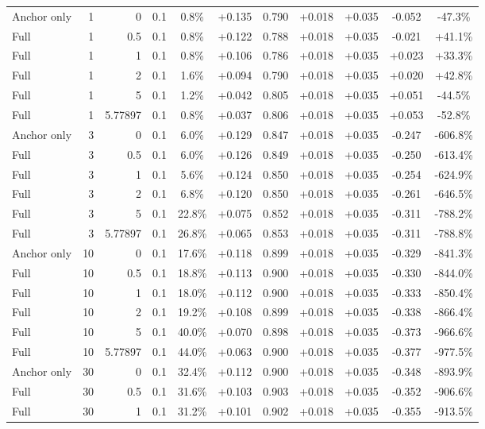 \begin{table}[htbp]
\begin{tabular}{lrrrccccccc}
Anchor only & 1 & 0 & 0.1 & 0.8\% & +0.135 & 0.790 & +0.018 & +0.035 & -0.052 & -47.3\% \\
Full & 1 & 0.5 & 0.1 & 0.8\% & +0.122 & 0.788 & +0.018 & +0.035 & -0.021 & +41.1\% \\
Full & 1 & 1 & 0.1 & 0.8\% & +0.106 & 0.786 & +0.018 & +0.035 & +0.023 & +33.3\% \\
Full & 1 & 2 & 0.1 & 1.6\% & +0.094 & 0.790 & +0.018 & +0.035 & +0.020 & +42.8\% \\
Full & 1 & 5 & 0.1 & 1.2\% & +0.042 & 0.805 & +0.018 & +0.035 & +0.051 & -44.5\% \\
Full & 1 & 5.77897 & 0.1 & 0.8\% & +0.037 & 0.806 & +0.018 & +0.035 & +0.053 & -52.8\% \\
Anchor only & 3 & 0 & 0.1 & 6.0\% & +0.129 & 0.847 & +0.018 & +0.035 & -0.247 & -606.8\% \\
Full & 3 & 0.5 & 0.1 & 6.0\% & +0.126 & 0.849 & +0.018 & +0.035 & -0.250 & -613.4\% \\
Full & 3 & 1 & 0.1 & 5.6\% & +0.124 & 0.850 & +0.018 & +0.035 & -0.254 & -624.9\% \\
Full & 3 & 2 & 0.1 & 6.8\% & +0.120 & 0.850 & +0.018 & +0.035 & -0.261 & -646.5\% \\
Full & 3 & 5 & 0.1 & 22.8\% & +0.075 & 0.852 & +0.018 & +0.035 & -0.311 & -788.2\% \\
Full & 3 & 5.77897 & 0.1 & 26.8\% & +0.065 & 0.853 & +0.018 & +0.035 & -0.311 & -788.8\% \\
Anchor only & 10 & 0 & 0.1 & 17.6\% & +0.118 & 0.899 & +0.018 & +0.035 & -0.329 & -841.3\% \\
Full & 10 & 0.5 & 0.1 & 18.8\% & +0.113 & 0.900 & +0.018 & +0.035 & -0.330 & -844.0\% \\
Full & 10 & 1 & 0.1 & 18.0\% & +0.112 & 0.900 & +0.018 & +0.035 & -0.333 & -850.4\% \\
Full & 10 & 2 & 0.1 & 19.2\% & +0.108 & 0.899 & +0.018 & +0.035 & -0.338 & -866.4\% \\
Full & 10 & 5 & 0.1 & 40.0\% & +0.070 & 0.898 & +0.018 & +0.035 & -0.373 & -966.6\% \\
Full & 10 & 5.77897 & 0.1 & 44.0\% & +0.063 & 0.900 & +0.018 & +0.035 & -0.377 & -977.5\% \\
Anchor only & 30 & 0 & 0.1 & 32.4\% & +0.112 & 0.900 & +0.018 & +0.035 & -0.348 & -893.9\% \\
Full & 30 & 0.5 & 0.1 & 31.6\% & +0.103 & 0.903 & +0.018 & +0.035 & -0.352 & -906.6\% \\
Full & 30 & 1 & 0.1 & 31.2\% & +0.101 & 0.902 & +0.018 & +0.035 & -0.355 & -913.5\% \\

\end{tabular}
\end{table}

